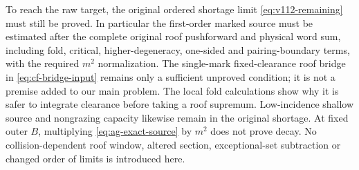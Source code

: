 To reach the raw target, the original ordered shortage limit
\eqref{eq:v112-remaining} must still be proved. In particular the
first-order marked source must be estimated after the complete
original roof pushforward and physical word sum, including fold,
critical, higher-degeneracy, one-sided and pairing-boundary terms,
with the required $m^2$ normalization. The single-mark fixed-clearance
roof bridge in \eqref{eq:cf-bridge-input} remains only a sufficient
unproved condition; it is not a premise added to our main problem.
The local fold calculations show why it is safer to integrate
clearance before taking a roof supremum. Low-incidence shallow
source and nongrazing capacity likewise remain in the original
shortage. At fixed outer $B$, multiplying
\eqref{eq:ag-exact-source} by $m^2$ does not prove decay. No
collision-dependent roof window, altered section, exceptional-set
subtraction or changed order of limits is introduced here.

